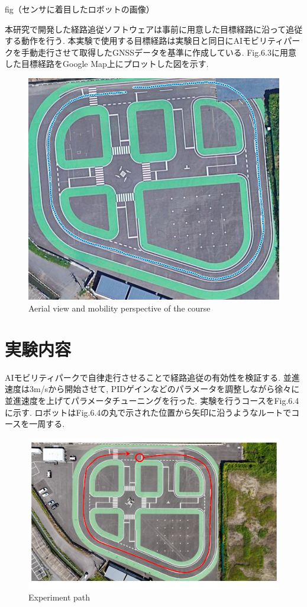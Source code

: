 fig（センサに着目したロボットの画像）

本研究で開発した経路追従ソフトウェアは事前に用意した目標経路に沿って追従する動作を行う.
本実験で使用する目標経路は実験日と同日にAIモビリティパークを手動走行させて取得したGNSSデータを基準に作成している.
Fig.6.3に用意した目標経路をGoogle Map上にプロットした図を示す.

\begin{figure}[H]
  \centering
 \includegraphics[keepaspectratio, scale=0.3]
      {images/targetpath.png}
 \caption{Aerial view and mobility perspective of the course}
 \label{fig:course}
\end{figure}

\section{実験内容}
AIモビリティパークで自律走行させることで経路追従の有効性を検証する.
並進速度は3m/sから開始させて, PIDゲインなどのパラメータを調整しながら徐々に並進速度を上げてパラメータチューニングを行った.
実験を行うコースをFig.6.4に示す.
ロボットはFig.6.4の丸で示された位置から矢印に沿うようなルートでコースを一周する.

\begin{figure}[H]
  \centering
 \includegraphics[keepaspectratio, scale=0.6]
      {images/AIFormulapath.png}
 \caption{Experiment path}
 \label{fig:path}
\end{figure}

